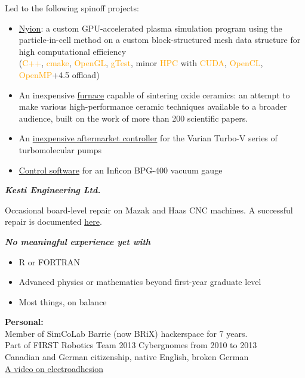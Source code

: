 \documentclass[fleqn,11pt]{article}
\newcommand{\ressection}[1]{\textbf{{\Large \textit{#1}}}\xrfill[0.1ex]{0.6pt}}
\newcommand{\sk}[1]{\textcolor{orange}{#1}}
\newcommand{\itemoptions}{\setlength{\itemindent}{-10pt} \setlength\itemsep{-1em}}
\begin{document}
Led to the following spinoff projects:
\begin{itemize}\itemoptions
	\item \href{https://github.com/0xDBFB7/Nyion}{Nyion}: a custom GPU-accelerated plasma simulation program using the particle-in-cell method on a custom block-structured mesh data structure for high computational efficiency\\
	(\sk{C++}, \sk{cmake}, \sk{OpenGL}, \sk{gTest}, minor \sk{HPC} with \sk{CUDA}, \sk{OpenCL}, \sk{OpenMP}+4.5 offload)
	\item An inexpensive \href{https://0xdbfb7.com/furnace.html}{furnace} capable of sintering oxide ceramics: an attempt to make various high-performance ceramic techniques available to a broader audience, built on the work of more than 200 scientific papers. 
	\item An \href{https://github.com/0xDBFB7/varian-turbo-controller}{inexpensive aftermarket controller} for the Varian Turbo-V series of turbomolecular pumps 
	\item \href{https://gist.github.com/0xDBFB7/7bd7048c6639270e6f291a2673903184}{Control software} for an Inficon BPG-400 vacuum gauge
\end{itemize}

\ressection{Kesti Engineering Ltd.}

Occasional board-level repair on Mazak and Haas CNC machines. A successful repair is documented \href{https://0xdbfb7.com/meldas.html}{here}.

\ressection{No meaningful experience yet with}

\begin{itemize}\itemoptions
	\item R or FORTRAN
	\item Advanced physics or mathematics beyond first-year graduate level
	\item Most things, on balance
\end{itemize}


\light{\makebox[\linewidth]{\rule{\textwidth}{0.4pt}}}


%
\begin{tcolorbox}
	\textbf{Personal:\\}
	Member of SimCoLab Barrie (now BRiX) hackerspace for 7 years.\\
	Part of FIRST Robotics Team 2013 Cybergnomes from 2010 to 2013\\
	Canadian and German citizenship, native English, broken German\\
	\href{https://www.youtube.com/watch?v=TQFxafFIoNM}{A video on electroadhesion}
\end{tcolorbox}
%
\end{document}
